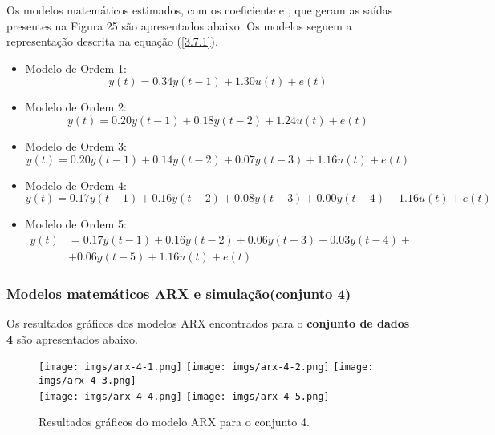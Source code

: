 \documentclass[a4paper,12pt]{article}
\begin{document}
Os modelos matemáticos estimados, com os coeficiente  e , que geram as saídas presentes na Figura 25 são apresentados abaixo. Os modelos seguem a representação descrita na equação (\ref{3.7.1}).
\begin{itemize}
    \item Modelo de Ordem 1:
    \begin{equation*}
    y(t) = 0.34y(t-1) + 1.30u(t) + e(t)
    \end{equation*}
    
    \item Modelo de Ordem 2:
    \begin{equation*}
    y(t) = 0.20y(t-1) + 0.18y(t-2) + 1.24u(t) + e(t)
    \end{equation*}
    
    \item Modelo de Ordem 3:
    \begin{equation*}
    y(t) = 0.20y(t-1) + 0.14y(t-2) + 0.07y(t-3) + 1.16u(t) + e(t)
    \end{equation*}
    
    \item Modelo de Ordem 4:
    \begin{equation*}
    y(t) = 0.17y(t-1) + 0.16y(t-2) + 0.08y(t-3) + 0.00y(t-4) + 1.16u(t) + e(t)
    \end{equation*}
    
    \item Modelo de Ordem 5:
    \begin{align*}
    y(t) &= 0.17y(t-1) + 0.16y(t-2) + 0.06y(t-3) - 0.03y(t-4) +\\
    &+ 0.06y(t-5) + 1.16u(t) + e(t)
    \end{align*}
\end{itemize}

\subsubsection{Modelos matemáticos ARX e simulação(conjunto 4)}

Os resultados gráficos dos modelos ARX encontrados para o \textbf{conjunto de dados 4} são apresentados abaixo.
\begin{figure}[h!]
\centering

\texttt{[image: imgs/arx-4-1.png]} \quad
\texttt{[image: imgs/arx-4-2.png]} \quad
\texttt{[image: imgs/arx-4-3.png]} \\

\texttt{[image: imgs/arx-4-4.png]} \quad
\texttt{[image: imgs/arx-4-5.png]}

\caption{Resultados gráficos do modelo ARX para o conjunto 4.}
\end{figure}
\end{document}
